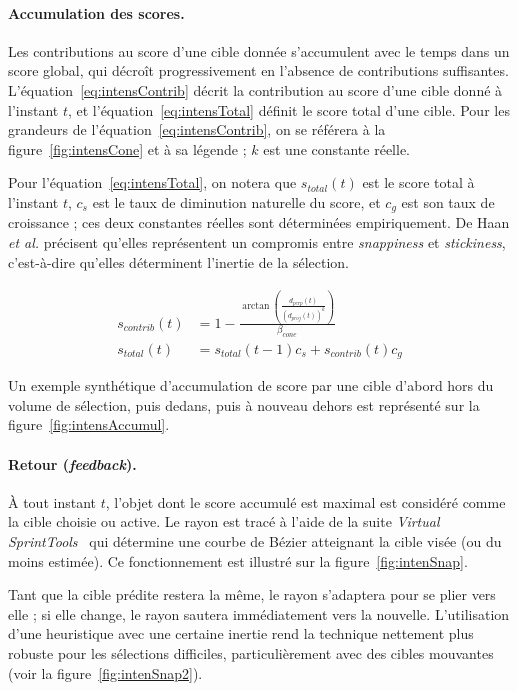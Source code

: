 	\paragraph{Accumulation des scores.}
	Les contributions au score d'une cible donnée s'accumulent avec le temps dans un score global, qui décroît progressivement en l'absence de contributions suffisantes. L'équation~\ref{eq:intensContrib} décrit la contribution au score d'une cible donné à l'instant $t$, et l'équation~\ref{eq:intensTotal} définit le score total d'une cible. Pour les grandeurs de l'équation~\ref{eq:intensContrib}, on se référera à la figure~\ref{fig:intensCone} et à sa légende ; $k$ est une constante réelle.
	
	Pour l'équation~\ref{eq:intensTotal}, on notera que $s_{total}(t)$ est le score total à l'instant $t$, $c_{s}$ est le taux de diminution naturelle du score, et $c_{g}$ est son taux de croissance ; ces deux constantes réelles sont déterminées empiriquement. De Haan \emph{et al.} précisent qu'elles représentent un compromis entre \emph{snappiness} et \emph{stickiness}, c'est-à-dire qu'elles déterminent l'inertie de la sélection.
	
	\begin{align}
		\label{eq:intensContrib}
		s_{contrib}(t) &= 1 - \frac{\arctan \left(\frac{d_{perp}(t)}{\left(d_{proj}(t)\right)^{k}}\right)}{\beta_{cone}} \\
		\label{eq:intensTotal}
		s_{total}(t) &= s_{total}(t-1)c_{s} + s_{contrib}(t)c_{g}
	\end{align}
	
	Un exemple synthétique d'accumulation de score par une cible d'abord hors du volume de sélection, puis dedans, puis à nouveau dehors est représenté sur la figure~\ref{fig:intensAccumul}.


	
	\paragraph{Retour (\emph{feedback}).}
	À tout instant $t$, l'objet dont le score accumulé est maximal est considéré comme la cible choisie ou active. Le rayon est tracé à l'aide de la suite \emph{Virtual SprintTools}~\cite{koutek2001spring} qui détermine une courbe de Bézier atteignant la cible visée (ou du moins estimée). Ce fonctionnement est illustré sur la figure~\ref{fig:intenSnap}.
	
	Tant que la cible prédite restera la même, le rayon s'adaptera pour se plier vers elle ; si elle change, le rayon sautera immédiatement vers la nouvelle. L'utilisation d'une heuristique avec une certaine \og inertie \fg{} rend la technique nettement plus robuste pour les sélections difficiles, particulièrement avec des cibles mouvantes (voir la figure~\ref{fig:intenSnap2}).
	
